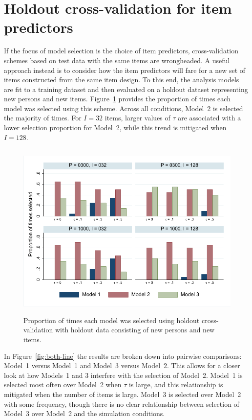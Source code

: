 \documentclass[12pt, letterpaper]{article}
\begin{document}
\section{Holdout cross-validation for item predictors}

If the focus of model selection is the choice of item predictors, cross-validation schemes based on test data with the same items are wrongheaded. A useful approach instead is to consider how the item predictors will fare for a new set of items constructed from the same item design. To this end, the analysis models are fit to a training dataset and then evaluated on a holdout dataset representing new persons and new items. Figure~\ref{fig:both-bar} provides the proportion of times each model was selected using this scheme. Across all conditions, Model~2 is selected the majority of times. For $I=32$ items, larger values of $\tau$ are associated with a lower selection proportion for Model~2, while this trend is mitigated when $I=128$.

\begin{figure}[htbp]
	\centering
	\includegraphics[height=3.5in, trim = 1mm 1mm 1mm 1mm, clip=true]
		{chapter_2/figs/p_new_person_new_item.pdf}
	\caption{Proportion of times each model was selected using holdout cross-validation with holdout data consisting of new persons and new items.}
	\label{fig:both-bar}
\end{figure}

In Figure~\ref{fig:both-line} the results are broken down into pairwise comparisons: Model~1 versus Model~1 and Model~3 versus Model~2. This allows for a closer look at how Models~1 and 3 interfere with the selection of Model~2. Model~1 is selected most often over Model~2 when $\tau$ is large, and this relationship is mitigated when the number of items is large. Model~3 is selected over Model~2 with some frequency, though there is no clear relationship between selection of Model~3 over Model~2 and the simulation conditions.
\end{document}
